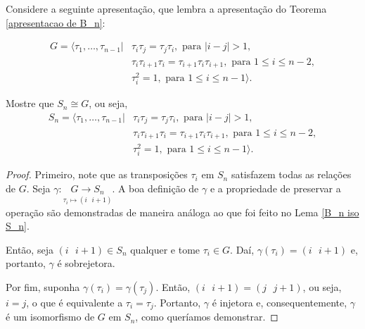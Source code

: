 	\begin{lemma}
		\label{apresentacao de S_n}
		Considere a seguinte apresentação, que lembra a apresentação do Teorema \eqref{apresentacao de B_n}:
		
		\begin{align*} G = \langle \tau_1,\dots,\tau_{n-1} | &\tau_i\tau_j = \tau_j\tau_i, \text{ para }|i - j|>1,\\ &\tau_i\tau_{i+1}\tau_i = \tau_{i+1}\tau_i\tau_{i+1}, \text{ para } 1\leq i\leq n-2, \\ &\tau_i^2 = 1, \text{ para }1\leq i\leq n-1\rangle. 
		\end{align*}
		
		\par\vspace{0.3cm} Mostre que $S_n\cong G$, ou seja, \begin{align*} S_n = \langle \tau_1,\dots,\tau_{n-1} | &\tau_i\tau_j = \tau_j\tau_i, \text{ para }|i - j|>1,\\ &\tau_i\tau_{i+1}\tau_i = \tau_{i+1}\tau_i\tau_{i+1}, \text{ para } 1\leq i\leq n-2, \\ &\tau_i^2 = 1, \text{ para }1\leq i\leq n-1\rangle. 
		\end{align*}
		
		
		
		
	\end{lemma}
	
	\begin{proof}
		Primeiro, note que as transposições $\tau_i$ em $S_n$ satisfazem todas as relações de $G$. Seja $\gamma:\underset{\tau_i\mapsto (i\text{ }i+1)}{G\to S_n}$. A boa definição de $\gamma$ e a propriedade de preservar a operação são demonstradas de maneira análoga ao que foi feito no Lema \eqref{B_n iso S_n}.
		\par\vspace{0.3cm} Então, seja $(i\text{ }i+1)\in S_n$ qualquer e tome $\tau_i\in G$. Daí, $\gamma(\tau_i) = (i\text{ }i+1)$ e, portanto, $\gamma$ é sobrejetora.
		\par\vspace{0.3cm} Por fim, suponha $\gamma(\tau_i) = \gamma(\tau_j)$. Então, $(i\text{ }i+1) = (j\text{ }j+1)$, ou seja, $i = j$, o que é equivalente a $\tau_i = \tau_j$. Portanto, $\gamma$ é injetora e, consequentemente, $\gamma$ é um isomorfismo de $G$ em $S_n$, como queríamos demonstrar.
	\end{proof}
	
